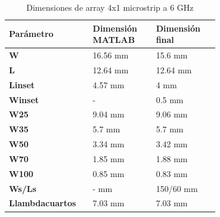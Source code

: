 \begin{table}[H]
  

   \small %
   \centering %
   \begin{tabular}{m{0.2\linewidth}m{0.25\linewidth}m{0.25\linewidth}} %
   \toprule[\heavyrulewidth]\toprule[\heavyrulewidth]
   \textbf{Parámetro} & \textbf{Dimensión MATLAB} & \textbf{Dimensión final} \\ 
   \midrule
   \textbf{W} & 16.56 mm & 15.6 mm \\
   \textbf{L} & 12.64 mm & 12.64 mm\\
   \textbf{Linset} & 4.57 mm & 4 mm\\
   \textbf{Winset} & - & 0.5 mm\\
   \textbf{W25} & 9.04 mm & 9.06 mm\\
   \textbf{W35} & 5.7 mm & 5.7 mm\\
   \textbf{W50} & 3.34 mm & 3.42 mm\\
   \textbf{W70} & 1.85 mm & 1.88 mm\\
   \textbf{W100} & 0.85 mm & 0.83 mm\\
   \textbf{Ws/Ls} & - mm & 150/60 mm\\
   \textbf{Llambdacuartos} & 7.03 mm & 7.03 mm\\
   \bottomrule[\heavyrulewidth] 
   \end{tabular}
   \caption{Dimensiones de array 4x1 microstrip a 6 GHz} 
      \label{tab:array4x42}
\end{table}

